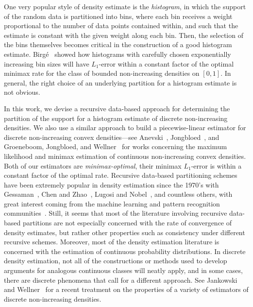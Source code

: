 One very popular style of density estimate is the \emph{histogram}, in
which the support of the random data is partitioned into bins, where
each bin receives a weight proportional to the number of data points
contained within, and such that the estimate is constant with the
given weight along each bin. Then, the selection of the bins
themselves becomes critical in the construction of a good histogram
estimate. Birg\'e~\cite{birge-risk} showed how histograms with
carefully chosen exponentially increasing bin sizes will have
$L_1$-error within a constant factor of the optimal minimax rate for
the class of bounded non-increasing densities on $[0, 1]$. In general,
the right choice of an underlying partition for a histogram estimate
is not obvious.

In this work, we devise a recursive data-based approach for
determining the partition of the support for a histogram estimate of
discrete non-increasing densities. We also use a similar approach to
build a piecewise-linear estimator for discrete non-increasing convex
densities---see Anevski~\cite{anevski},
Jongbloed~\cite{jongbloed-thesis}, and Groeneboom, Jongbloed, and
Wellner~\cite{groeneboom-convex} for works concerning the maximum
likelihood and minimax estimation of continuous non-increasing convex
densities. Both of our estimators are \emph{minimax-optimal}, \ie
their minimax $L_1$-error is within a constant factor of the optimal
rate. Recursive data-based partitioning schemes have been extremely
popular in density estimation since the 1970's with
Gessaman~\cite{gessaman}, Chen and Zhao~\cite{chen}, Lugosi and
Nobel~\cite{lugosi-nobel}, and countless others, with great interest
coming from the machine learning and pattern recognition
communities~\cite{pattern}. Still, it seems that most of the
literature involving recursive data-based partitions are not
especially concerned with the rate of convergence of density
estimates, but rather other properties such as consistency under
different recursive schemes. Moreover, most of the density estimation
literature is concerned with the estimation of continuous probability
distributions. In discrete density estimation, not all of the
constructions or methods used to develop arguments for analogous
continuous classes will neatly apply, and in some cases, there are
discrete phenomena that call for a different approach. See Jankowski
and Wellner~\cite{jank} for a recent treatment on the properties of a
variety of estimators of discrete non-increasing densities.
